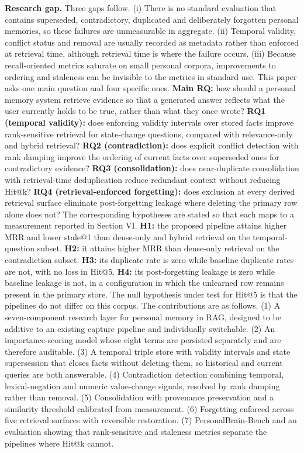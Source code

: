 \documentclass[conference]{IEEEtran}
\begin{document}
\textbf{Research gap.} Three gaps follow. (i) There is no standard evaluation that contains superseded, contradictory, duplicated and deliberately forgotten personal memories, so these failures are unmeasurable in aggregate. (ii) Temporal validity, conflict status and removal are usually recorded as metadata rather than enforced at retrieval time, although retrieval time is where the failure occurs. (iii) Because recall-oriented metrics saturate on small personal corpora, improvements to ordering and staleness can be invisible to the metrics in standard use.
This paper asks one main question and four specific ones. \textbf{Main RQ:} how should a personal memory system retrieve evidence so that a generated answer reflects what the user currently holds to be true, rather than what they once wrote? \textbf{RQ1 (temporal validity):} does enforcing validity intervals over stored facts improve rank-sensitive retrieval for state-change questions, compared with relevance-only and hybrid retrieval? \textbf{RQ2 (contradiction):} does explicit conflict detection with rank damping improve the ordering of current facts over superseded ones for contradictory evidence? \textbf{RQ3 (consolidation):} does near-duplicate consolidation with retrieval-time deduplication reduce redundant context without reducing Hit@k? \textbf{RQ4 (retrieval-enforced forgetting):} does exclusion at every derived retrieval surface eliminate post-forgetting leakage where deleting the primary row alone does not?
The corresponding hypotheses are stated so that each maps to a measurement reported in Section VI. \textbf{H1:} the proposed pipeline attains higher MRR and lower stale@1 than dense-only and hybrid retrieval on the temporal-question subset. \textbf{H2:} it attains higher MRR than dense-only retrieval on the contradiction subset. \textbf{H3:} its duplicate rate is zero while baseline duplicate rates are not, with no loss in Hit@5. \textbf{H4:} its post-forgetting leakage is zero while baseline leakage is not, in a configuration in which the unlearned row remains present in the primary store. The null hypothesis under test for Hit@5 is that the pipelines do not differ on this corpus.
The contributions are as follows. (1) A seven-component research layer for personal memory in RAG, designed to be additive to an existing capture pipeline and individually switchable. (2) An importance-scoring model whose eight terms are persisted separately and are therefore auditable. (3) A temporal triple store with validity intervals and state supersession that closes facts without deleting them, so historical and current queries are both answerable. (4) Contradiction detection combining temporal, lexical-negation and numeric value-change signals, resolved by rank damping rather than removal. (5) Consolidation with provenance preservation and a similarity threshold calibrated from measurement. (6) Forgetting enforced across five retrieval surfaces with reversible restoration. (7) PersonalBrain-Bench and an evaluation showing that rank-sensitive and staleness metrics separate the pipelines where Hit@k cannot.
\end{document}
